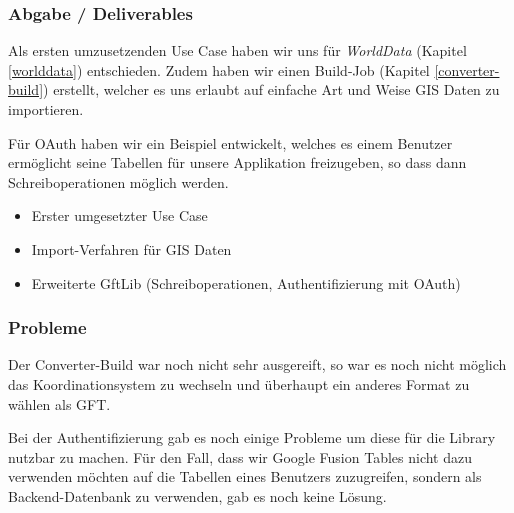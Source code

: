\subsubsection{Abgabe / Deliverables}
Als ersten umzusetzenden Use Case haben wir uns für \emph{WorldData} (Kapitel \ref{worlddata}) entschieden. Zudem haben wir einen Build-Job (Kapitel \ref{converter-build}) erstellt, welcher es uns erlaubt auf einfache Art und Weise GIS Daten zu importieren.

Für OAuth haben wir ein Beispiel entwickelt, welches es einem Benutzer ermöglicht seine Tabellen für unsere Applikation freizugeben, so dass dann Schreiboperationen möglich werden.

\begin{itemize}
	\item Erster umgesetzter Use Case
	\item Import-Verfahren für GIS Daten
	\item Erweiterte GftLib (Schreiboperationen, Authentifizierung mit OAuth)
\end{itemize}

\subsubsection{Probleme}
Der Converter-Build war noch nicht sehr ausgereift, so war es noch nicht möglich das Koordinationsystem zu wechseln und überhaupt ein anderes Format zu wählen als GFT.

Bei der Authentifizierung gab es noch einige Probleme um diese für die Library nutzbar zu machen. Für den Fall, dass wir Google Fusion Tables nicht dazu verwenden möchten auf die Tabellen eines Benutzers zuzugreifen, sondern als Backend-Datenbank zu verwenden, gab es noch keine Lösung.